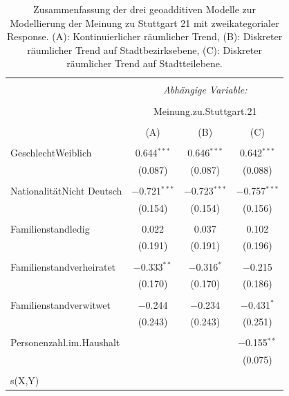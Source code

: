 \documentclass{Vorlage}
\begin{document}
\begin{appendix}
\begin{table}[!htbp] \centering 
  \caption{Zusammenfassung der drei geoadditiven Modelle zur Modellierung der Meinung zu Stuttgart 21 mit zweikategorialer Response. (A): Kontinuierlicher räumlicher Trend, (B): Diskreter räumlicher Trend auf Stadtbezirksebene, (C): Diskreter räumlicher Trend auf Stadtteilebene.} 
  \label{ParameterTabS212spat} 
\begin{tabular}{@{\extracolsep{5pt}}lccc} 
\\[-1.8ex]\hline 
\hline \\[-1.8ex] 
 & \multicolumn{3}{c}{\textit{Abhängige Variable:}} \\ 
\cline{2-4} 
\\[-1.8ex] & \multicolumn{3}{c}{Meinung.zu.Stuttgart.21} \\ 
\\[-1.8ex] & (A) & (B) & (C)\\ 
\hline \\[-1.8ex] 
 GeschlechtWeiblich & 0.644$^{***}$ & 0.646$^{***}$ & 0.642$^{***}$ \\ 
  & (0.087) & (0.087) & (0.088) \\ 
  & & & \\ 
 NationalitätNicht Deutsch & $-$0.721$^{***}$ & $-$0.723$^{***}$ & $-$0.757$^{***}$ \\ 
  & (0.154) & (0.154) & (0.156) \\ 
  & & & \\ 
 Familienstandledig & 0.022 & 0.037 & 0.102 \\ 
  & (0.191) & (0.191) & (0.196) \\ 
  & & & \\ 
 Familienstandverheiratet & $-$0.333$^{**}$ & $-$0.316$^{*}$ & $-$0.215 \\ 
  & (0.170) & (0.170) & (0.186) \\ 
  & & & \\ 
 Familienstandverwitwet & $-$0.244 & $-$0.234 & $-$0.431$^{*}$ \\ 
  & (0.243) & (0.243) & (0.251) \\ 
  & & & \\ 
   Personenzahl.im.Haushalt &  &  & $-$0.155$^{**}$ \\ 
  &  &  & (0.075) \\ 
    & & & \\ \hline
 s(X,Y) &  &  &  \\ 

\end{tabular}
\end{table}
\end{appendix}
\end{document}
